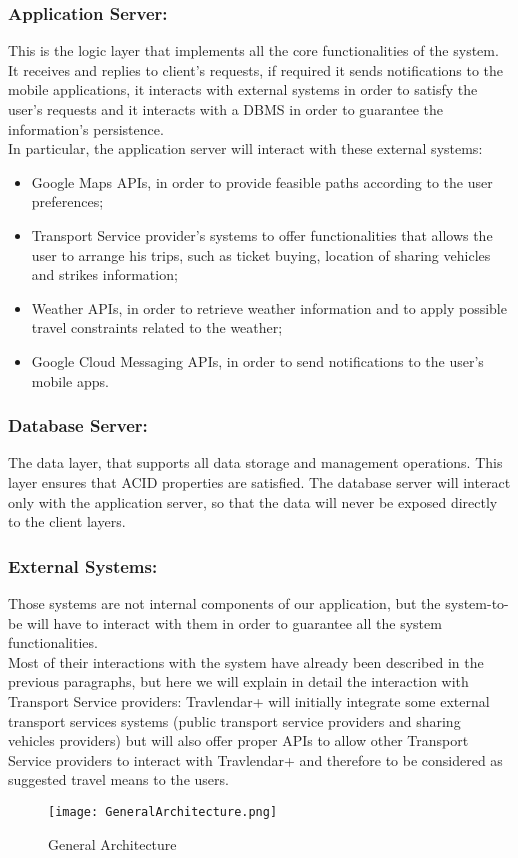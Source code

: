 \subsubsection{Application Server:}
\label{subsubsect:Application Server}
This is the logic layer that implements all the core functionalities of the system. It receives and replies to client's requests, if required it sends notifications to the mobile applications, it interacts with external systems in order to satisfy the user's requests and it interacts with a DBMS in order to guarantee the information's persistence.\\
In particular, the application server will interact with these external systems:
\begin{itemize}
\item Google Maps APIs, in order to provide feasible paths according to the user preferences;
\item Transport Service provider's systems to offer functionalities that allows the user to arrange his trips, such as ticket buying, location of sharing vehicles and strikes information;
\item Weather APIs, in order to retrieve weather information and to apply possible travel constraints related to the weather;
\item Google Cloud Messaging APIs, in order to send notifications to the user's mobile apps.
\end{itemize} 

\subsubsection{Database Server:}
\label{subsubsect:Database Server}
The data layer, that supports all data storage and management operations. This layer ensures that ACID properties are satisfied. The database server will interact only with the application server, so that the data will never be exposed directly to the client layers.

\subsubsection{External Systems:}
\label{subsubsect:External Systems}
Those systems are not internal components of our application, but the system-to-be will have to interact with them in order to guarantee all the system functionalities. \\
Most of their interactions with the system have already been described in the previous paragraphs, but here we will explain in detail the interaction with Transport Service providers: Travlendar+ will initially integrate some external transport services systems (public transport service providers and sharing vehicles providers) but will also offer proper APIs to allow other Transport Service providers to interact with Travlendar+ and therefore to be considered as suggested travel means to the users.

\begin{figure}[H]
\begin{center}
		\hspace*{-50pt}
		\texttt{[image: GeneralArchitecture.png]}
\end{center}
\caption{General Architecture}
\end{figure}
